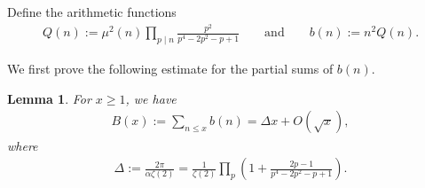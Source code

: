 \documentclass[12pt,letterpaper,reqno]{amsart}
\theoremstyle{plain}
\newtheorem{lemma}[theorem]{Lemma}
\theoremstyle{definition}
\numberwithin{equation}{section}
\numberwithin{figure}{section}
\numberwithin{table}{section}
\newcommand{\lrp}[1]{\!\left(#1\right)}
\begin{document}
Define the arithmetic functions
\begin{align*}
    Q(n):=\mu^2(n) \prod_{p\mid n}\frac{p^2}{p^4-2p^2-p+1} 
    \qquad\text{and}\qquad
    b(n) := n^2 Q(n).
\end{align*}

We first prove the following estimate for the partial sums of $b(n)$.
\begin{lemma} \label{lem:B-approx}
    For $x \ge 1$, we have
    \begin{align}
        B(x) := \sum_{n \le x} b(n) = \Delta x + O\lrp{\sqrt x},
    \end{align}
    where 
    \begin{align}
        \Delta:=\frac{2\pi}{\alpha\zeta(2)} =\frac{1}{\zeta(2)}\prod_p\left(1+\frac{2p-1}{p^4-2p^2-p+1}\right).
    \end{align}
\end{lemma}
\end{document}
